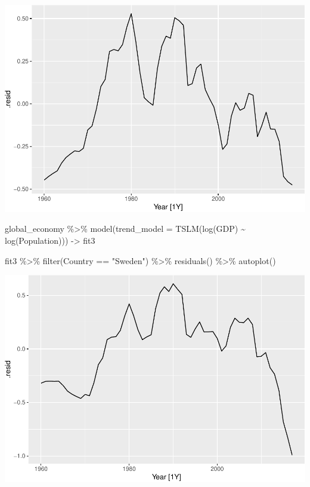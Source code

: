 \documentclass[
]{book}
\newenvironment{Shaded}{\begin{snugshade}}{\end{snugshade}}
\newcommand{\AttributeTok}[1]{\textcolor[rgb]{0.77,0.63,0.00}{#1}}
\newcommand{\FunctionTok}[1]{\textcolor[rgb]{0.00,0.00,0.00}{#1}}
\newcommand{\NormalTok}[1]{#1}
\newcommand{\OtherTok}[1]{\textcolor[rgb]{0.56,0.35,0.01}{#1}}
\newcommand{\SpecialCharTok}[1]{\textcolor[rgb]{0.00,0.00,0.00}{#1}}
\newcommand{\StringTok}[1]{\textcolor[rgb]{0.31,0.60,0.02}{#1}}
\begin{document}
\includegraphics{graphics/unnamed-chunk-67-1.pdf}

\begin{Shaded}
\begin{Highlighting}[]
\NormalTok{global\_economy }\SpecialCharTok{\%\textgreater{}\%} \FunctionTok{model}\NormalTok{(}\AttributeTok{trend\_model =} \FunctionTok{TSLM}\NormalTok{(}\FunctionTok{log}\NormalTok{(GDP) }\SpecialCharTok{\textasciitilde{}} \FunctionTok{log}\NormalTok{(Population))) }\OtherTok{{-}\textgreater{}}\NormalTok{ fit3}

\NormalTok{fit3 }\SpecialCharTok{\%\textgreater{}\%} \FunctionTok{filter}\NormalTok{(Country }\SpecialCharTok{==} \StringTok{"Sweden"}\NormalTok{) }\SpecialCharTok{\%\textgreater{}\%} \FunctionTok{residuals}\NormalTok{() }\SpecialCharTok{\%\textgreater{}\%} \FunctionTok{autoplot}\NormalTok{()}
\end{Highlighting}
\end{Shaded}

\includegraphics{graphics/unnamed-chunk-68-1.pdf}
\end{document}
